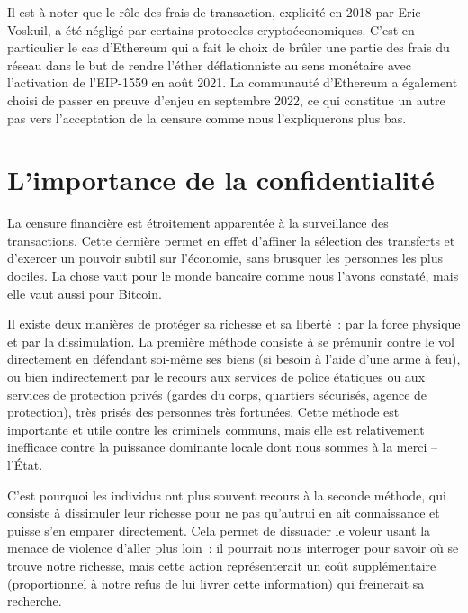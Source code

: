 Il est à noter que le rôle des frais de transaction, explicité en 2018 par Eric Voskuil, a été négligé par certains protocoles cryptoéconomiques. C'est en particulier le cas d'Ethereum qui a fait le choix de brûler une partie des frais du réseau dans le but de rendre l'éther déflationniste au sens monétaire avec l'activation de l'EIP-1559 en août 2021. La communauté d'Ethereum a également choisi de passer en preuve d'enjeu en septembre 2022, ce qui constitue un autre pas vers l'acceptation de la censure comme nous l'expliquerons plus bas.

\vspace{-1em}
\section*{L'importance de la confidentialité}

La censure financière est étroitement apparentée à la surveillance des transactions. Cette dernière permet en effet d'affiner la sélection des transferts et d'exercer un pouvoir subtil sur l'économie, sans brusquer les personnes les plus dociles. La chose vaut pour le monde bancaire comme nous l'avons constaté, mais elle vaut aussi pour Bitcoin.


Il existe deux manières de protéger sa richesse et sa liberté~: par la force physique et par la dissimulation. La première méthode consiste à se prémunir contre le vol directement en défendant soi-même ses biens (si besoin à l'aide d'une arme à feu), ou bien indirectement par le recours aux services de police étatiques ou aux services de protection privés (gardes du corps, quartiers sécurisés, agence de protection), très prisés des personnes très fortunées. Cette méthode est importante et utile contre les criminels communs, mais elle est relativement inefficace contre la puissance dominante locale dont nous sommes à la merci -- l'État.

C'est pourquoi les individus ont plus souvent recours à la seconde méthode, qui consiste à dissimuler leur richesse pour ne pas qu'autrui en ait connaissance et puisse s'en emparer directement. Cela permet de dissuader le voleur usant la menace de violence d'aller plus loin~: il pourrait nous interroger pour savoir où se trouve notre richesse, mais cette action représenterait un coût supplémentaire (proportionnel à notre refus de lui livrer cette information) qui freinerait sa recherche.


